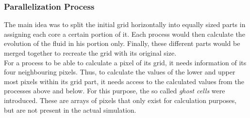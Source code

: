 \documentclass[12pt, a4paper, titlepage]{article}
\newcommand{\vp}{\vspace{1cm}}
\begin{document}
{\vp
\subsubsection{Parallelization Process}
%
The main idea was to split the initial grid horizontally into equally sized parts in assigning each core a certain portion of it. Each process would then calculate the evolution of the fluid in his portion only. Finally, these different parts would be merged together to recreate the grid with its original size.\\
For a process to be able to calculate a pixel of its grid, it needs information of its four neighbouring pixels. Thus, to calculate the values of the lower and upper most pixels within its grid part, it needs access to the calculated values from the processes above and below. For this purpose, the so called \textit{ghost cells} were introduced. These are arrays of pixels that only exist for calculation purposes, but are not present in the actual simulation.
%			
}
\end{document}
